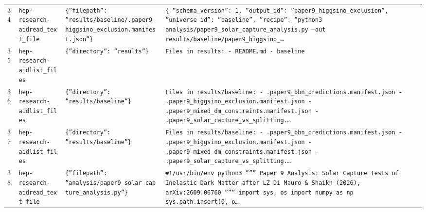 \documentclass[11pt,a4paper]{article}
\begin{document}
\begin{longtable}{@{}p{}p{}p{}p{}@{}}
34 & \texttt{hep-research-aid}\newline\texttt{read\_\allowbreak{}text\_\allowbreak{}file} & \texttt{\{''filepath'':\allowbreak{} ''results/\allowbreak{}baseline/\allowbreak{}.paper9\_\allowbreak{}higgsino\_\allowbreak{}exclusion.manifest.json''\}\allowbreak{}} & \texttt{\{   ''schema\_\allowbreak{}version'':\allowbreak{} 1,\allowbreak{}   ''output\_\allowbreak{}id'':\allowbreak{} ''paper9\_\allowbreak{}higgsino\_\allowbreak{}exclusion'',\allowbreak{}   ''universe\_\allowbreak{}id'':\allowbreak{} ''baseline'',\allowbreak{}   ''recipe'':\allowbreak{} ''python3 analysis/\allowbreak{}paper9\_\allowbreak{}solar\_\allowbreak{}capture\_\allowbreak{}analysis.py --out results/\allowbreak{}baseline/\allowbreak{}paper9\_\allowbreak{}higgsino\_\allowbreak{}\ldots{}\allowbreak{}} \\
35 & \texttt{hep-research-aid}\newline\texttt{list\_\allowbreak{}files} & \texttt{\{''directory'':\allowbreak{} ''results''\}\allowbreak{}} & \texttt{Files in results:\allowbreak{}   - README.md   - baseline} \\
36 & \texttt{hep-research-aid}\newline\texttt{list\_\allowbreak{}files} & \texttt{\{''directory'':\allowbreak{} ''results/\allowbreak{}baseline''\}\allowbreak{}} & \texttt{Files in results/\allowbreak{}baseline:\allowbreak{}   - .paper9\_\allowbreak{}bbn\_\allowbreak{}predictions.manifest.json   - .paper9\_\allowbreak{}higgsino\_\allowbreak{}exclusion.manifest.json   - .paper9\_\allowbreak{}mixed\_\allowbreak{}dm\_\allowbreak{}constraints.manifest.json   - .paper9\_\allowbreak{}solar\_\allowbreak{}capture\_\allowbreak{}vs\_\allowbreak{}splitting.\ldots{}\allowbreak{}} \\
37 & \texttt{hep-research-aid}\newline\texttt{list\_\allowbreak{}files} & \texttt{\{''directory'':\allowbreak{} ''results/\allowbreak{}baseline''\}\allowbreak{}} & \texttt{Files in results/\allowbreak{}baseline:\allowbreak{}   - .paper9\_\allowbreak{}bbn\_\allowbreak{}predictions.manifest.json   - .paper9\_\allowbreak{}higgsino\_\allowbreak{}exclusion.manifest.json   - .paper9\_\allowbreak{}mixed\_\allowbreak{}dm\_\allowbreak{}constraints.manifest.json   - .paper9\_\allowbreak{}solar\_\allowbreak{}capture\_\allowbreak{}vs\_\allowbreak{}splitting.\ldots{}\allowbreak{}} \\
38 & \texttt{hep-research-aid}\newline\texttt{read\_\allowbreak{}text\_\allowbreak{}file} & \texttt{\{''filepath'':\allowbreak{} ''analysis/\allowbreak{}paper9\_\allowbreak{}solar\_\allowbreak{}capture\_\allowbreak{}analysis.py''\}\allowbreak{}} & \texttt{\#!/\allowbreak{}usr/\allowbreak{}bin/\allowbreak{}env python3 '''''' Paper 9 Analysis:\allowbreak{} Solar Capture Tests of Inelastic Dark Matter after LZ Di Mauro \& Shaikh (2026)\allowbreak{},\allowbreak{} arXiv:\allowbreak{}2609.06760 '''''' import sys,\allowbreak{} os import numpy as np sys.path.insert(0,\allowbreak{} o\ldots{}\allowbreak{}} \\

\end{longtable}
\end{document}
